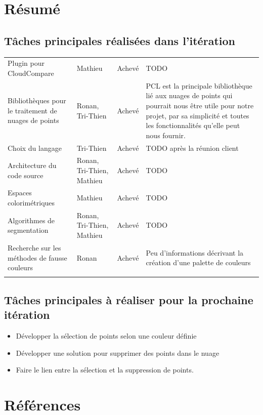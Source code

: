 \documentclass[12pt,titlepage,french]{article}
\begin{document}
\section{Résumé}
\subsection{Tâches principales réalisées dans l'itération}
\noindent\begin{tabu} to \toprule
  &&&\\\toprule
Plugin pour CloudCompare
& Mathieu
& Achevé
& TODO\\\midrule
Bibliothèques pour le traitement de nuages de points
& Ronan, Tri-Thien
& Achevé
& PCL est la principale bibliothèque lié aux nuages de points qui pourrait nous être utile pour notre projet, par sa simplicité et toutes les fonctionnalités qu'elle peut nous fournir.\\\midrule
Choix du langage
& Tri-Thien
& Achevé
& TODO après la réunion client\\\midrule
Architecture du code source
& Ronan, Tri-Thien, Mathieu
& Achevé
& TODO\\\midrule
Espaces colorimétriques
& Mathieu
& Achevé
& TODO\\\midrule
Algorithmes de segmentation
& Ronan, Tri-Thien, Mathieu
& Achevé
& TODO\\\midrule
Recherche sur les méthodes de fausse couleurs
& Ronan
& Achevé
& Peu d'informations décrivant la création d'une palette de couleurs\\\bottomrule  \\
\end{tabu}

\subsection{Tâches principales à réaliser pour la prochaine itération}
\begin{itemize}
  \item Développer la sélection de points selon une couleur définie
  \item Développer une solution pour supprimer des points dans le nuage
  \item Faire le lien entre la sélection et la suppression de points.
\end{itemize}

\newpage

\section {Références}
\end{document}
